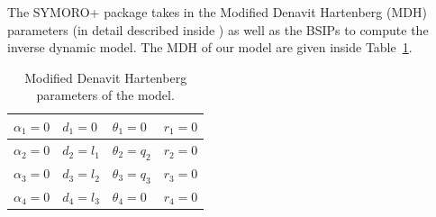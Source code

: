\documentclass[12pt, a4paper]{article}
\begin{document}
The SYMORO+ package takes in the Modified Denavit Hartenberg (MDH) parameters (in detail described inside \cite{craig2009introduction}) as well as the BSIPs to compute the inverse dynamic model. The MDH of our model are given inside Table~\ref{table:MDH}.
\begin{table}[h!]
    \centering
    \begin{tabular}{|l|l|l|l|}
         \hline
         $\alpha_1 = 0$ & $d_1 = 0$ & $\theta_1 = 0$ & $r_1 = 0$ \\
         \hline
         $\alpha_2 = 0$ & $d_2 = l_1$ & $\theta_2 = q_2$ & $r_2 = 0$ \\
         \hline
         $\alpha_3 = 0$ & $d_3 = l_2$ & $\theta_3 = q_3$ & $r_3 = 0$ \\
         \hline
         $\alpha_4 = 0$ & $d_4 = l_3$ & $\theta_4 = 0$ & $r_4 = 0$ \\
         \hline
    \end{tabular}
    \caption{Modified Denavit Hartenberg parameters of the model.}
    \label{table:MDH}
\end{table}
\end{document}
